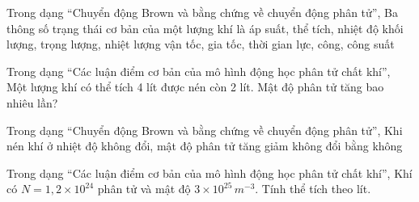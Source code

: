 \begin{ex}
Trong dạng “Chuyển động Brown và bằng chứng về chuyển động phân tử”, Ba thông số trạng thái cơ bản của một lượng khí là
\choice
{\True áp suất, thể tích, nhiệt độ}
{khối lượng, trọng lượng, nhiệt lượng}
{vận tốc, gia tốc, thời gian}
{lực, công, công suất}
\end{ex}

\begin{ex}
Trong dạng “Các luận điểm cơ bản của mô hình động học phân tử chất khí”, Một lượng khí có thể tích 4 lít được nén còn 2 lít. Mật độ phân tử tăng bao nhiêu lần?
\end{ex}

\begin{ex}
Trong dạng “Chuyển động Brown và bằng chứng về chuyển động phân tử”, Khi nén khí ở nhiệt độ không đổi, mật độ phân tử
\choice
{\True tăng}
{giảm}
{không đổi}
{bằng không}
\end{ex}

\begin{ex}
Trong dạng “Các luận điểm cơ bản của mô hình động học phân tử chất khí”, Khí có $N=1,2\times10^{24}$ phân tử và mật độ $3\times10^{25}\,m^{-3}$. Tính thể tích theo lít.
\end{ex}

